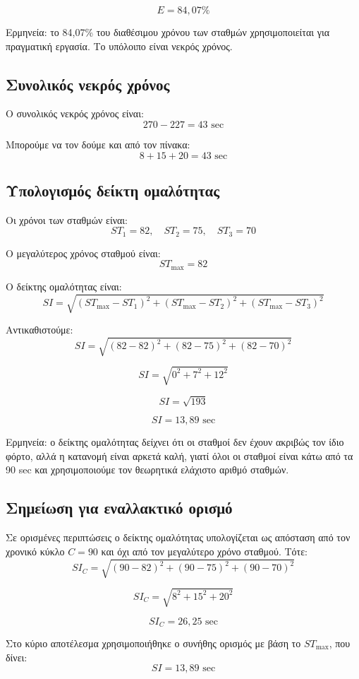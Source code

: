 \documentclass[12pt,a4paper]{article}
\begin{document}
\[
\boxed{E=84{,}07\%}
\]

Ερμηνεία: το 84,07\% του διαθέσιμου χρόνου των σταθμών χρησιμοποιείται για πραγματική εργασία. Το υπόλοιπο είναι νεκρός χρόνος.

\subsection{Συνολικός νεκρός χρόνος}

Ο συνολικός νεκρός χρόνος είναι:
\[
270-227=43 \text{ sec}
\]

Μπορούμε να τον δούμε και από τον πίνακα:
\[
8+15+20=43 \text{ sec}
\]

\subsection{Υπολογισμός δείκτη ομαλότητας}

Οι χρόνοι των σταθμών είναι:
\[
ST_1=82,\quad ST_2=75,\quad ST_3=70
\]

Ο μεγαλύτερος χρόνος σταθμού είναι:
\[
ST_{\max}=82
\]

Ο δείκτης ομαλότητας είναι:
\[
SI=\sqrt{(ST_{\max}-ST_1)^2+(ST_{\max}-ST_2)^2+(ST_{\max}-ST_3)^2}
\]

Αντικαθιστούμε:
\[
SI=\sqrt{(82-82)^2+(82-75)^2+(82-70)^2}
\]

\[
SI=\sqrt{0^2+7^2+12^2}
\]

\[
SI=\sqrt{193}
\]

\[
\boxed{SI=13{,}89 \text{ sec}}
\]

Ερμηνεία: ο δείκτης ομαλότητας δείχνει ότι οι σταθμοί δεν έχουν ακριβώς τον ίδιο φόρτο, αλλά η κατανομή είναι αρκετά καλή, γιατί όλοι οι σταθμοί είναι κάτω από τα 90 sec και χρησιμοποιούμε τον θεωρητικά ελάχιστο αριθμό σταθμών.

\subsection{Σημείωση για εναλλακτικό ορισμό}

Σε ορισμένες περιπτώσεις ο δείκτης ομαλότητας υπολογίζεται ως απόσταση από τον χρονικό κύκλο \(C=90\) και όχι από τον μεγαλύτερο χρόνο σταθμού. Τότε:
\[
SI_C=\sqrt{(90-82)^2+(90-75)^2+(90-70)^2}
\]

\[
SI_C=\sqrt{8^2+15^2+20^2}
\]

\[
SI_C=26{,}25 \text{ sec}
\]

Στο κύριο αποτέλεσμα χρησιμοποιήθηκε ο συνήθης ορισμός με βάση το \(ST_{\max}\), που δίνει:
\[
SI=13{,}89 \text{ sec}
\]
\end{document}
